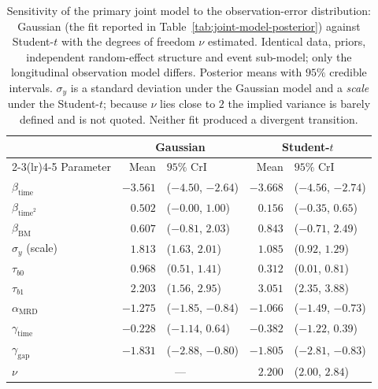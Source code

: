 \begin{table}[!htbp]
\centering
\caption{Sensitivity of the primary joint model to the observation-error distribution: Gaussian (the fit reported in Table~\ref{tab:joint-model-posterior}) against Student-$t$ with the degrees of freedom $\nu$ estimated. Identical data, priors, independent random-effect structure and event sub-model; only the longitudinal observation model differs. Posterior means with $95\%$ credible intervals. $\sigma_y$ is a standard deviation under the Gaussian model and a \emph{scale} under the Student-$t$; because $\nu$ lies close to $2$ the implied variance is barely defined and is not quoted. Neither fit produced a divergent transition.}
\label{tab:studentt}
\small
\begin{tabular}{lrlrl}
\toprule
 & \multicolumn{2}{c}{Gaussian} & \multicolumn{2}{c}{Student-$t$}\\
\cmidrule(lr){2-3}\cmidrule(lr){4-5}
Parameter & Mean & $95\%$ CrI & Mean & $95\%$ CrI\\
\midrule
$\beta_{\mathrm{time}}$ & $-3.561$ & ($-4.50$, $-2.64$) & $-3.668$ & ($-4.56$, $-2.74$)\\
$\beta_{\mathrm{time}^2}$ & $0.502$ & ($-0.00$, $1.00$) & $0.156$ & ($-0.35$, $0.65$)\\
$\beta_{\mathrm{BM}}$ & $0.607$ & ($-0.81$, $2.03$) & $0.843$ & ($-0.71$, $2.49$)\\
$\sigma_y$ (scale) & $1.813$ & ($1.63$, $2.01$) & $1.085$ & ($0.92$, $1.29$)\\
$\tau_{b0}$ & $0.968$ & ($0.51$, $1.41$) & $0.312$ & ($0.01$, $0.81$)\\
$\tau_{b1}$ & $2.203$ & ($1.56$, $2.95$) & $3.051$ & ($2.35$, $3.88$)\\
$\alpha_{\mathrm{MRD}}$ & $-1.275$ & ($-1.85$, $-0.84$) & $-1.066$ & ($-1.49$, $-0.73$)\\
$\gamma_{\mathrm{time}}$ & $-0.228$ & ($-1.14$, $0.64$) & $-0.382$ & ($-1.22$, $0.39$)\\
$\gamma_{\mathrm{gap}}$ & $-1.831$ & ($-2.88$, $-0.80$) & $-1.805$ & ($-2.81$, $-0.83$)\\
$\nu$ & \multicolumn{2}{c}{---} & $2.200$ & ($2.00$, $2.84$)\\
\bottomrule
\end{tabular}
\end{table}
